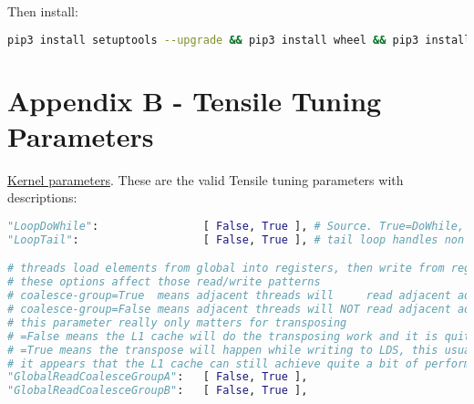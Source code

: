 \documentclass[]{article}
\begin{document}
\noindent Then install:

\begin{lstlisting}[language=bash,breaklines=true]
pip3 install setuptools --upgrade && pip3 install wheel && pip3 install pyyaml msgpack openpyxl pandas
\end{lstlisting}

\section{Appendix B - Tensile Tuning Parameters}
\label{sec:appendixB}

\href{https://github.com/ROCmSoftwarePlatform/Tensile/wiki/Kernel-Parameters}{Kernel parameters}.
These are the valid Tensile tuning parameters with descriptions:

\begin{lstlisting}[language=python,breaklines=true] "LoopDoWhile":                [ False, True ], # Source. True=DoWhile, False=For loop
"LoopTail":                   [ False, True ], # tail loop handles non multiples of unrolled summation loop

# threads load elements from global into registers, then write from registers to LDS
# these options affect those read/write patterns
# coalesce-group=True  means adjacent threads will     read adjacent addresses; if the data needs to be transposed then adjacent threads will NOT write adjacent elements to LDS.
# coalesce-group=False means adjacent threads will NOT read adjacent addresses; if the data needs to be transposed then adjacent threads will     write adjacent elements to LDS.
# this parameter really only matters for transposing
# =False means the L1 cache will do the transposing work and it is quite fast; then data is written coalesced (no bank conflicts) to LDS.
# =True means the transpose will happen while writing to LDS, this usually has bank conflicts, but it appears the throughput is still fast enough to not slow the VALUs down.
# it appears that the L1 cache can still achieve quite a bit of performance for GRCG=False, but overall it's usually faster to read coalesced
"GlobalReadCoalesceGroupA":   [ False, True ],
"GlobalReadCoalesceGroupB":   [ False, True ],


\end{lstlisting}
\end{document}
